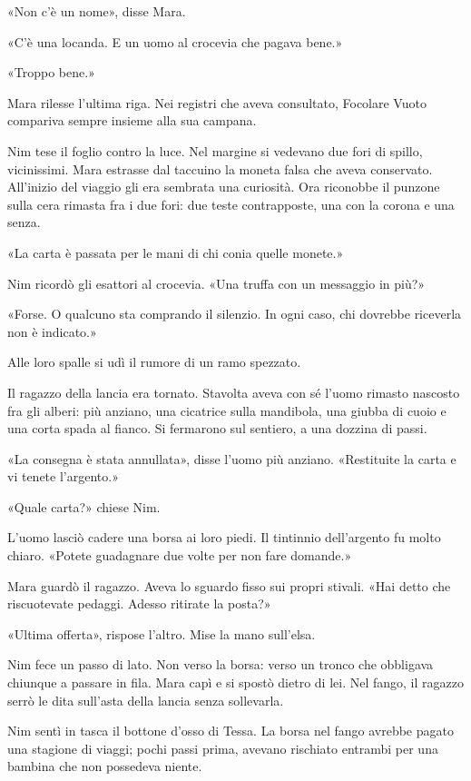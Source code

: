 \documentclass[10pt,a4paper]{article}
\begin{document}
«Non c'è un nome», disse Mara.

«C'è una locanda. E un uomo al crocevia che pagava bene.»

«Troppo bene.»

Mara rilesse l'ultima riga. Nei registri che aveva consultato, Focolare Vuoto compariva sempre insieme alla sua campana.

Nim tese il foglio contro la luce. Nel margine si vedevano due fori di spillo, vicinissimi. Mara estrasse dal taccuino la moneta falsa che aveva conservato. All'inizio del viaggio gli era sembrata una curiosità. Ora riconobbe il punzone sulla cera rimasta fra i due fori: due teste contrapposte, una con la corona e una senza.

«La carta è passata per le mani di chi conia quelle monete.»

Nim ricordò gli esattori al crocevia. «Una truffa con un messaggio in più?»

«Forse. O qualcuno sta comprando il silenzio. In ogni caso, chi dovrebbe riceverla non è indicato.»

Alle loro spalle si udì il rumore di un ramo spezzato.

Il ragazzo della lancia era tornato. Stavolta aveva con sé l'uomo rimasto nascosto fra gli alberi: più anziano, una cicatrice sulla mandibola, una giubba di cuoio e una corta spada al fianco. Si fermarono sul sentiero, a una dozzina di passi.

«La consegna è stata annullata», disse l'uomo più anziano. «Restituite la carta e vi tenete l'argento.»

«Quale carta?» chiese Nim.

L'uomo lasciò cadere una borsa ai loro piedi. Il tintinnio dell'argento fu molto chiaro. «Potete guadagnare due volte per non fare domande.»

Mara guardò il ragazzo. Aveva lo sguardo fisso sui propri stivali. «Hai detto che riscuotevate pedaggi. Adesso ritirate la posta?»

«Ultima offerta», rispose l'altro. Mise la mano sull'elsa.

Nim fece un passo di lato. Non verso la borsa: verso un tronco che obbligava chiunque a passare in fila. Mara capì e si spostò dietro di lei. Nel fango, il ragazzo serrò le dita sull'asta della lancia senza sollevarla.

Nim sentì in tasca il bottone d'osso di Tessa. La borsa nel fango avrebbe pagato una stagione di viaggi; pochi passi prima, avevano rischiato entrambi per una bambina che non possedeva niente.
\end{document}
